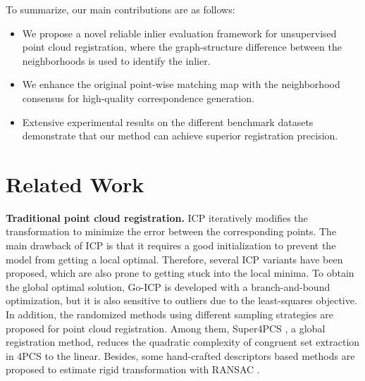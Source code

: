 \documentclass[letterpaper]{article} %
\begin{document}
	To summarize, our main contributions are as follows: 
	\begin{itemize}
		\item  We propose a novel reliable inlier evaluation framework for unsupervised point cloud registration, where the graph-structure difference between the neighborhoods is used to identify the inlier.
		\item We enhance the original point-wise matching map with the neighborhood consensus for high-quality correspondence generation.
		\item Extensive experimental results on the different benchmark datasets demonstrate that our method can achieve superior registration precision.
	\end{itemize}
	
	\section{Related Work}
	\noindent \textbf{Traditional point cloud registration.} ICP \cite{besl1992method} iteratively modifies the transformation to minimize the error between the corresponding points. The main drawback of ICP is that it requires a good initialization to prevent the model from getting a local optimal. Therefore, several ICP variants \cite{phillips2007outlier,bouaziz2013sparse,segal2009generalized} have been proposed, which are also prone to getting stuck into the local minima. To obtain the global optimal solution, Go-ICP \cite{yang2013go} is developed with a branch-and-bound optimization, but it is also sensitive to outliers due to the least-squares objective. %
	In addition, the randomized methods \cite{chen1999ransac,le2019sdrsac} using different sampling strategies are proposed for point cloud registration. %
	Among them, Super4PCS \cite{mellado2014super}, a global registration method, reduces the quadratic complexity of congruent set extraction in 4PCS \cite{aiger20084} to the linear. Besides, some hand-crafted descriptors \cite{rusu2008aligning, rusu2009fast, tombari2010unique} based methods are proposed to estimate rigid transformation with RANSAC \cite{fischler1981random}.
\end{document}
